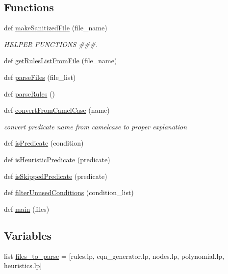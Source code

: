 \subsection*{Functions}
\begin{DoxyCompactItemize}
\item 
def \hyperlink{namespacebackup__explanation__extractor_ae51b01d8c3e5086d2b19beb5b987150f}{make\+Sanitized\+File} (file\+\_\+name)
\begin{DoxyCompactList}\small\item\em H\+E\+L\+P\+E\+R F\+U\+N\+C\+T\+I\+O\+N\+S \#\#\#. \end{DoxyCompactList}\item 
def \hyperlink{namespacebackup__explanation__extractor_aa761046202ff522175b70f61fa55e7fa}{get\+Rules\+List\+From\+File} (file\+\_\+name)
\item 
def \hyperlink{namespacebackup__explanation__extractor_af766f7564352e867a33c729257abf58c}{parse\+Files} (file\+\_\+list)
\item 
def \hyperlink{namespacebackup__explanation__extractor_a27ba333fe108951d398839d9f09bc131}{parse\+Rules} ()
\item 
def \hyperlink{namespacebackup__explanation__extractor_a00f143c652b1f1c8028e660aa492cbaa}{convert\+From\+Camel\+Case} (name)
\begin{DoxyCompactList}\small\item\em convert predicate name from camelcase to proper explanation \end{DoxyCompactList}\item 
def \hyperlink{namespacebackup__explanation__extractor_a63235fa6432ae68c4af6d2f599af3ae2}{is\+Predicate} (condition)
\item 
def \hyperlink{namespacebackup__explanation__extractor_ab6dd6b5063f67001af246bfbbf8f75a4}{is\+Heuristic\+Predicate} (predicate)
\item 
def \hyperlink{namespacebackup__explanation__extractor_ac67d352bf37181e6a01ebf534a128d38}{is\+Skipped\+Predicate} (predicate)
\item 
def \hyperlink{namespacebackup__explanation__extractor_aaa45b4b2e8470f6a38d6450c11872141}{filter\+Unused\+Conditions} (condition\+\_\+list)
\item 
def \hyperlink{namespacebackup__explanation__extractor_ac2eb1ac173ebcad12b7f4463c65578ec}{main} (files)
\end{DoxyCompactItemize}
\subsection*{Variables}
\begin{DoxyCompactItemize}
\item 
list \hyperlink{namespacebackup__explanation__extractor_a8ca3177d62dbe8c44c1b1a8066af71a7}{files\+\_\+to\+\_\+parse} = \mbox{[}\textquotesingle{}rules.\+lp\textquotesingle{}, \textquotesingle{}eqn\+\_\+generator.\+lp\textquotesingle{}, \textquotesingle{}nodes.\+lp\textquotesingle{}, \textquotesingle{}polynomial.\+lp\textquotesingle{}, \textquotesingle{}heuristics.\+lp\textquotesingle{}\mbox{]}
\end{DoxyCompactItemize}



